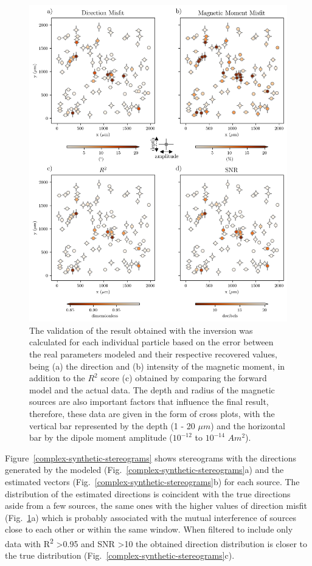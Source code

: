 \begin{figure}[htbp!]
\centering
\includegraphics[width=0.75\linewidth]{figures/complex-synthetic-comparison.png}
\caption{
The validation of the result obtained with the inversion was calculated for each individual particle based on the error between the real parameters modeled and their respective recovered values, being (a) the direction and (b) intensity of the magnetic moment, in addition to the $R^2$ score (c) obtained by comparing the forward model and the actual data. The depth and radius of the magnetic sources are also important factors that influence the final result, therefore, these data are given in the form of cross plots, with the vertical bar represented by the depth (1 - 20 $\mu m$) and the horizontal bar by the dipole moment amplitude ($10^{-12}$ to $10^{-14}$ $Am^2$).
}
\label{complex-synthetic-comparison}
\end{figure}

Figure~\ref{complex-synthetic-stereograms} shows stereograms with the directions generated by the modeled (Fig.~\ref{complex-synthetic-stereograms}a) and the estimated vectors (Fig.~\ref{complex-synthetic-stereograms}b) for each source. The distribution of the estimated directions is coincident with the true directions aside from a few sources, the same ones with the higher values of direction misfit (Fig.~\ref{complex-synthetic-comparison}a) which is probably associated with the mutual interference of sources close to each other or within the same window. When filtered to include only data with R\textsuperscript{2} \textgreater 0.95 and SNR \textgreater 10 the obtained direction distribution is closer to the true distribution (Fig.~\ref{complex-synthetic-stereograms}c).

